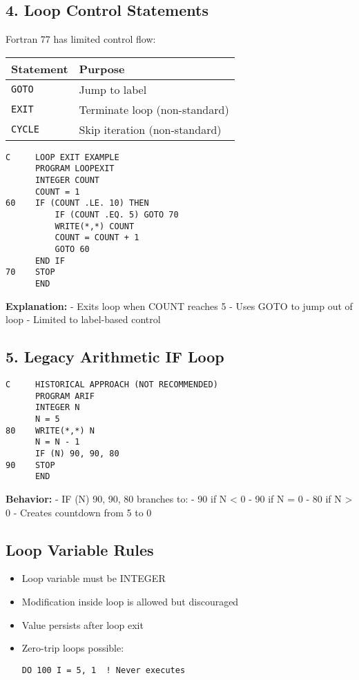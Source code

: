 \documentclass{book}
\begin{document}
\subsection*{4. Loop Control Statements}
Fortran 77 has limited control flow:
\begin{center}
\begin{tabular}{|l|l|}
\hline
\textbf{Statement} & \textbf{Purpose} \\ 
\hline
\texttt{GOTO} & Jump to label \\
\texttt{EXIT} & Terminate loop (non-standard) \\
\texttt{CYCLE} & Skip iteration (non-standard) \\
\hline
\end{tabular}
\end{center}

\begin{verbatim}
C     LOOP EXIT EXAMPLE
      PROGRAM LOOPEXIT
      INTEGER COUNT
      COUNT = 1
60    IF (COUNT .LE. 10) THEN
          IF (COUNT .EQ. 5) GOTO 70
          WRITE(*,*) COUNT
          COUNT = COUNT + 1
          GOTO 60
      END IF
70    STOP
      END
\end{verbatim}
\textbf{Explanation:}
- Exits loop when COUNT reaches 5
- Uses GOTO to jump out of loop
- Limited to label-based control

\subsection*{5. Legacy Arithmetic IF Loop}
\begin{verbatim}
C     HISTORICAL APPROACH (NOT RECOMMENDED)
      PROGRAM ARIF
      INTEGER N
      N = 5
80    WRITE(*,*) N
      N = N - 1
      IF (N) 90, 90, 80
90    STOP
      END
\end{verbatim}
\textbf{Behavior:}
- IF (N) 90, 90, 80 branches to:
  - 90 if N < 0
  - 90 if N = 0
  - 80 if N > 0
- Creates countdown from 5 to 0

\subsection*{Loop Variable Rules}
\begin{itemize}
\item Loop variable must be INTEGER
\item Modification inside loop is allowed but discouraged
\item Value persists after loop exit
\item Zero-trip loops possible:
\begin{verbatim}
DO 100 I = 5, 1  ! Never executes
\end{verbatim}
\end{itemize}
\end{document}
